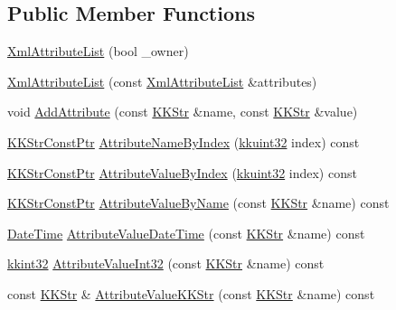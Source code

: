 \subsection*{Public Member Functions}
\begin{DoxyCompactItemize}
\item 
\hyperlink{class_k_k_b_1_1_xml_attribute_list_a6de978a65392c992fe11736aa5d90a88}{Xml\+Attribute\+List} (bool \+\_\+owner)
\item 
\hyperlink{class_k_k_b_1_1_xml_attribute_list_a8154307977ce6cd95d1a52196bbc3461}{Xml\+Attribute\+List} (const \hyperlink{class_k_k_b_1_1_xml_attribute_list}{Xml\+Attribute\+List} \&attributes)
\item 
void \hyperlink{class_k_k_b_1_1_xml_attribute_list_ab3eb98b55d4874281ba91c342422bd83}{Add\+Attribute} (const \hyperlink{class_k_k_b_1_1_k_k_str}{K\+K\+Str} \&name, const \hyperlink{class_k_k_b_1_1_k_k_str}{K\+K\+Str} \&value)
\item 
\hyperlink{namespace_k_k_b_a46f665ec17615c856eff3d21f78bed5c}{K\+K\+Str\+Const\+Ptr} \hyperlink{class_k_k_b_1_1_xml_attribute_list_af1933bdf7634b45e3fef432d1542c8d9}{Attribute\+Name\+By\+Index} (\hyperlink{namespace_k_k_b_af8d832f05c54994a1cce25bd5743e19a}{kkuint32} index) const 
\item 
\hyperlink{namespace_k_k_b_a46f665ec17615c856eff3d21f78bed5c}{K\+K\+Str\+Const\+Ptr} \hyperlink{class_k_k_b_1_1_xml_attribute_list_a8535e0974a45c3820f8b43f6c6f459dc}{Attribute\+Value\+By\+Index} (\hyperlink{namespace_k_k_b_af8d832f05c54994a1cce25bd5743e19a}{kkuint32} index) const 
\item 
\hyperlink{namespace_k_k_b_a46f665ec17615c856eff3d21f78bed5c}{K\+K\+Str\+Const\+Ptr} \hyperlink{class_k_k_b_1_1_xml_attribute_list_a21a30ed3b18c0ab3517dfd57d4d4f450}{Attribute\+Value\+By\+Name} (const \hyperlink{class_k_k_b_1_1_k_k_str}{K\+K\+Str} \&name) const 
\item 
\hyperlink{class_k_k_b_1_1_date_time}{Date\+Time} \hyperlink{class_k_k_b_1_1_xml_attribute_list_a575e44934a102d84feef0fa7df40a7ef}{Attribute\+Value\+Date\+Time} (const \hyperlink{class_k_k_b_1_1_k_k_str}{K\+K\+Str} \&name) const 
\item 
\hyperlink{namespace_k_k_b_a8fa4952cc84fda1de4bec1fbdd8d5b1b}{kkint32} \hyperlink{class_k_k_b_1_1_xml_attribute_list_ade591332c27a5b659ab87560c140d9ae}{Attribute\+Value\+Int32} (const \hyperlink{class_k_k_b_1_1_k_k_str}{K\+K\+Str} \&name) const 
\item 
const \hyperlink{class_k_k_b_1_1_k_k_str}{K\+K\+Str} \& \hyperlink{class_k_k_b_1_1_xml_attribute_list_ae7baf3bee375c9673c3725d5449c06ad}{Attribute\+Value\+K\+K\+Str} (const \hyperlink{class_k_k_b_1_1_k_k_str}{K\+K\+Str} \&name) const 

\end{DoxyCompactItemize}
